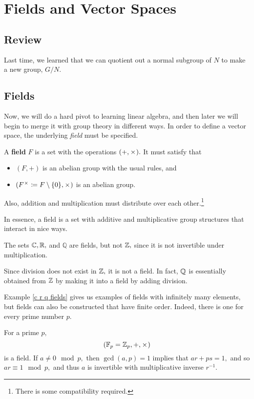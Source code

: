 
\section{Fields and Vector Spaces}
\subsection{Review}
Last time, we learned that we can quotient out a normal subgroup of $N$ to make a new group, $G/N.$

\subsection{Fields}

Now, we will do a hard pivot to learning linear algebra, and then later we will begin to merge it with group theory in different ways. In order to define a vector space, the underlying \emph{field} must be specified.
\begin{definition}
A \textbf{field} $F$ is a set with the operations $(+, \hspace{0.05em}{\times}\hspace{0.05em}).$ It must satisfy that 
\begin{itemize}
    \item $(F, +)$ is an abelian group with the usual rules, and
    \item $(F^{\hspace{0.05em}{\times}\hspace{0.05em}} \coloneqq F \setminus \{0\}, \hspace{0.05em}{\times}\hspace{0.05em})$ is an abelian group.
\end{itemize}
Also, addition and multiplication must distribute over each other.\footnote{There is some compatibility required.} %
\end{definition}

In essence, a field is a set with additive and multiplicative group structures that interact in nice ways.
\begin{example}\label{c r q fields}
The sets $\mathbb C, \mathbb R, $ and $\mathbb{Q}$ are fields, but not $\mathbb Z,$ since it is not invertible under multiplication.
\end{example}

Since division does not exist in $\mathbb Z,$ it is not a field. In fact, $\mathbb Q$ is essentially obtained from $\mathbb Z$ by making it into a field by adding division.

Example \ref{c r q fields} gives us examples of fields with infinitely many elements, but fields can also be constructed that have finite order. Indeed, there is one for every prime number $p.$
\begin{example}
For a prime $p,$ 
\[
(\mathbb{F}_p = \mathbb Z_p, +, \hspace{0.05em}{\times}\hspace{0.05em})
\]
is a field. If $a \neq 0 \mod p,$ then $\gcd(a, p) = 1$ implies that $ar + ps = 1,$ and so $ar \equiv 1 \mod p,$ and thus $a$ is invertible with multiplicative inverse $r^{-1}.$
\end{example}

